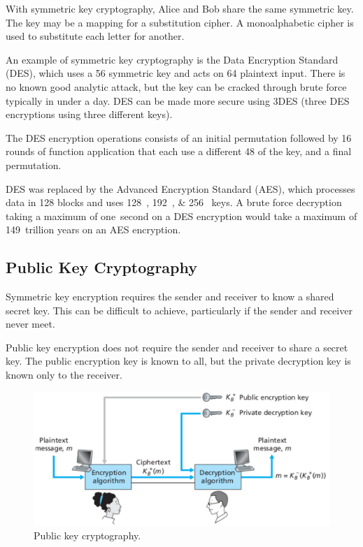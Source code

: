 With symmetric key cryptography, Alice and Bob share the same symmetric key.
The key may be a mapping for a substitution cipher.
A monoalphabetic cipher is used to substitute each letter for another.

An example of symmetric key cryptography is the Data Encryption Standard (DES), which uses a \SI{56}{\bit} symmetric key and acts on \SI{64}{\bit} plaintext input.
There is no known good analytic attack, but the key can be cracked through brute force typically in under a day.
DES can be made more secure using 3DES (three DES encryptions using three different keys).

The DES encryption operations consists of an initial permutation followed by \num{16} rounds of function application that each use a different \SI{48}{\bit} of the key, and a final permutation.

DES was replaced by the Advanced Encryption Standard (AES), which processes data in \SI{128}{\bit} blocks and uses \SIlist[list-final-separator={ or }]{128;192;256}{\bit} keys.
A brute force decryption taking a maximum of one~second on a DES encryption would take a maximum of \num{149}~trillion years on an AES encryption.

\subsection{Public Key Cryptography}

Symmetric key encryption requires the sender and receiver to know a shared secret key.
This can be difficult to achieve, particularly if the sender and receiver never meet.

Public key encryption does not require the sender and receiver to share a secret key.
The public encryption key is known to all, but the private decryption key is known only to the receiver.

\begin{figure}[htp]
  \centering
  \includegraphics[width=12cm]{unit-20/figures/alice-bob-public.png}
  \caption*{Public key cryptography.}
\end{figure}

